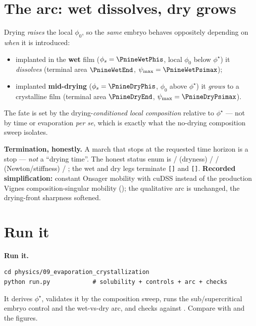 \section{The arc: wet dissolves, dry grows}

Drying \emph{raises} the local $\phi_0$, so the \emph{same} embryo behaves
oppositely depending on \emph{when} it is introduced:
\begin{itemize}[nosep]
  \item implanted in the \textbf{wet} film ($\phi_s=\ensuremath{\PnineWetPhis}$,
        local $\phi_0$ below $\phi^\star$) it \emph{dissolves}
        (terminal area $\ensuremath{\PnineWetEnd}$,
        $\psi_{\max}=\ensuremath{\PnineWetPsimax}$);
  \item implanted \textbf{mid-drying} ($\phi_s=\ensuremath{\PnineDryPhis}$,
        $\phi_0$ above $\phi^\star$) it \emph{grows} to a crystalline film
        (terminal area $\ensuremath{\PnineDryEnd}$,
        $\psi_{\max}=\ensuremath{\PnineDryPsimax}$).
\end{itemize}
The fate is set by the drying-\emph{conditioned local composition} relative
to $\phi^\star$ --- not by time or evaporation \emph{per se}, which is
exactly what the no-drying composition sweep isolates.

\begin{keybox}
\textbf{Termination, honestly.} A march that stops at the requested time
horizon is a  stop --- \emph{not} a ``drying time''. The
honest status enum is  / 
(dryness) /  /  (Newton/stiffness) /
; the wet and dry legs terminate
\texttt{[\PnineWetTerm]} and \texttt{[\PnineDryTerm]}.
\textbf{Recorded simplification:} constant Onsager mobility with cuDSS
instead of the production Vignes composition-singular mobility
(); the qualitative arc is unchanged,
the drying-front sharpness softened.
\end{keybox}

\section{Run it}

\begin{runbox}
\textbf{Run it.}
\begin{lstlisting}
cd physics/09_evaporation_crystallization
python run.py            # solubility + controls + arc + checks
\end{lstlisting}
It derives $\phi^\star$, validates it by the composition sweep, runs the
sub/supercritical embryo control and the wet-vs-dry arc, and checks
 against . Compare with
 and the figures.
\end{runbox}

